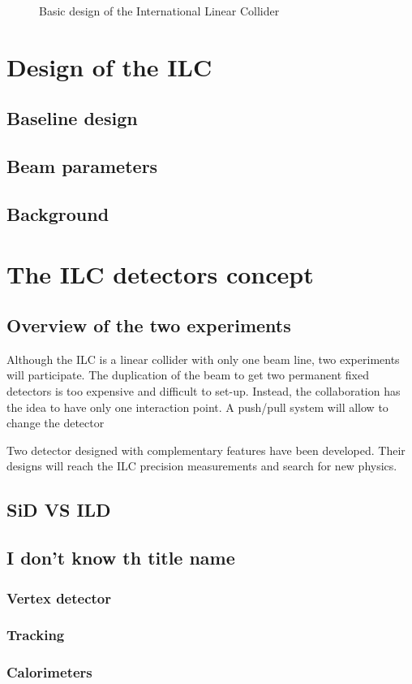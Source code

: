   \begin{figure}
    \centering
    \caption{Basic design of the International Linear Collider}
    \label{fig:ILC}
  \end{figure}
  \section{Design of the ILC}
    \subsection{Baseline design}
    \subsection{Beam parameters}
    \subsection{Background}

  \section{The ILC detectors concept}

    \subsection{Overview of the two experiments}
    
  Although the ILC is a linear collider with only one beam line, two experiments will participate.
  The duplication of the beam to get two permanent fixed detectors is too expensive and difficult to set-up.
  Instead, the collaboration has the idea to have only one interaction point.
  A push/pull system will allow to change the detector 

  Two detector designed with complementary features have been developed. 
  Their designs will reach the ILC precision measurements and search for new physics. 


      \subsection{SiD VS ILD}

    \subsection{I don't know th title name}
      \subsubsection{Vertex detector}
      \subsubsection{Tracking}
      \subsubsection{Calorimeters}
